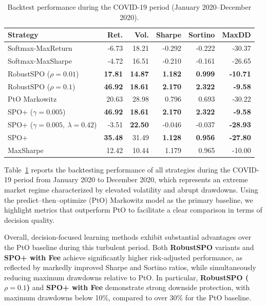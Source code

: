 \documentclass[review]{elsarticle}
\begin{document}
\begin{table}[htbp]
\centering
\caption{Backtest performance during the COVID-19 period (January 2020--December 2020).}
\label{tab:covid_backtest}
\begin{tabular}{lrrrrr}
\toprule
\textbf{Strategy} &
\textbf{Ret.} &
\textbf{Vol.} &
\textbf{Sharpe} &
\textbf{Sortino} &
\textbf{MaxDD} \\
\midrule
Softmax-MaxReturn
 & -6.73 & 18.21 & -0.292 & -0.222 & -30.37 \\
Softmax-MaxSharpe
 & -4.72 & 16.51 & -0.210 & -0.161 & -26.65 \\
RobustSPO ($\rho=0.01$)
 & \textbf{17.81} & \textbf{14.87} & \textbf{1.182} & \textbf{0.999} & \textbf{-10.71} \\
RobustSPO ($\rho=0.1$)
 & \textbf{46.92} & \textbf{18.61} & \textbf{2.170} & \textbf{2.322} & \textbf{-9.58} \\
PtO Markowitz
 & 20.63 & 28.98 & 0.796 & 0.693 & -30.22 \\
SPO+ ($\gamma=0.005$)
 & \textbf{46.92} & \textbf{18.61} & \textbf{2.170} & \textbf{2.322} & \textbf{-9.58} \\
SPO+ ($\gamma=0.005,\ \lambda=0.42$)
 & -3.51 & \textbf{22.50} & -0.046 & -0.037 & \textbf{-28.93} \\
SPO+
 & \textbf{35.48} & 31.49 & \textbf{1.128} & \textbf{0.956} & \textbf{-27.80} \\
MaxSharpe
 & 12.42 & 10.44 & 1.179 & 0.965 & -10.00 \\
\bottomrule
\end{tabular}
\end{table}

Table~\ref{tab:covid_backtest} reports the backtesting performance of all strategies during the COVID-19 period from January 2020 to December 2020, which represents an extreme market regime characterized by elevated volatility and abrupt drawdowns.
Using the predict--then--optimize (PtO) Markowitz model as the primary baseline, we highlight metrics that outperform PtO to facilitate a clear comparison in terms of decision quality.

Overall, decision-focused learning methods exhibit substantial advantages over the PtO baseline during this turbulent period.
Both \textbf{RobustSPO} variants and \textbf{SPO+ with Fee} achieve significantly higher risk-adjusted performance, as reflected by markedly improved Sharpe and Sortino ratios, while simultaneously reducing maximum drawdowns relative to PtO.
In particular, \textbf{RobustSPO ($\rho=0.1$)} and \textbf{SPO+ with Fee} demonstrate strong downside protection, with maximum drawdowns below 10\%, compared to over 30\% for the PtO baseline.
\end{document}
